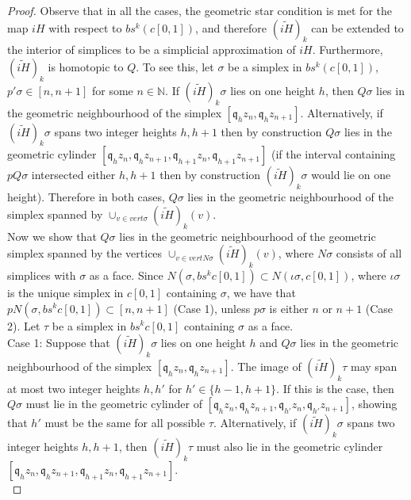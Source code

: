 \documentclass[a4paper,11pt]{article}
\theoremstyle{definition}
\theoremstyle{plain}
\theoremstyle{remark}
\begin{document}
{\begin{proof}
Observe that in all the cases, the geometric star condition is met for the map $iH$ with respect to $bs^{k}(c[0,1])$, and therefore $(\widetilde{iH})_{k}$ can be extended to the interior of simplices to be a simplicial approximation of $iH$. Furthermore, $(\widetilde{iH})_{k}$ is homotopic to $Q$. To see this, let $\sigma$ be a simplex in $bs^{k}(c[0,1])$, $p'\sigma \in [n,n+1]$ for some $n\in \mathbb{N}$. If $(\widetilde{iH})_{k}\sigma$ lies on one height $h$, then $Q\sigma$ lies in the geometric neighbourhood of the simplex $[\mathfrak{q}_{h}z_{n},\mathfrak{q}_{h}z_{n+1}]$. Alternatively, if $(\widetilde{iH})_{k}\sigma$ spans two integer heights $h,h+1$ then by construction $Q\sigma$ lies in the geometric cylinder $[\mathfrak{q}_{h}z_{n},\mathfrak{q}_{h}z_{n+1},\mathfrak{q}_{h+1}z_{n},\mathfrak{q}_{h+1}z_{n+1}]$ (if the interval containing $pQ\sigma$ intersected either $h,h+1$ then by construction $(\widetilde{iH})_{k}\sigma$ would lie on one height). Therefore in both cases, $Q\sigma$ lies in the geometric neighbourhood of the simplex spanned by $\cup_{v\in vert \sigma} (\widetilde{iH})_{k}(v)$.  \\


Now we show that $Q\sigma$ lies in the geometric neighbourhood of the geometric simplex spanned by the vertices $\cup_{v\in vert N\sigma} (\widetilde{iH})_{k}(v)$, where $N\sigma$ consists of all simplices with $\sigma$ as a face. Since $N(\sigma, bs^{k}{c[0,1]}) \subset N(\iota \sigma,c[0,1])$, where $\iota \sigma$ is the unique simplex in $c[0,1]$ containing $\sigma$, we have that $pN(\sigma, bs^{k}{c[0,1]})\subset [n,n+1]$ (Case 1), unless $p\sigma$ is either $n$ or $n+1$ (Case 2). Let $\tau$ be a simplex in $bs^{k}{c[0,1]}$ containing $\sigma$ as a face. \\

Case 1: Suppose that  $(\widetilde{iH})_{k}\sigma$ lies on one height $h$ and $Q\sigma$ lies in the geometric neighbourhood of the simplex $[\mathfrak{q}_{h}z_{n},\mathfrak{q}_{h}z_{n+1}]$. The image of $(\widetilde{iH})_{k}\tau$ may span at most two integer heights $h,h'$ for $h'\in \{h-1,h+1\}$. If this is the case, then $Q\sigma$ must lie in the geometric cylinder of $[\mathfrak{q}_{h}z_{n},\mathfrak{q}_{h} z_{n+1}, \mathfrak{q}_{h'}z_{n},\mathfrak{q}_{h'} z_{n+1}]$, showing that $h'$ must be the same for all possible $\tau$.  Alternatively, if $(\widetilde{iH})_{k}\sigma$ spans two integer heights $h,h+1$, then $(\widetilde{iH})_{k}\tau$ must also lie in the geometric cylinder $[\mathfrak{q}_{h}z_{n},\mathfrak{q}_{h}z_{n+1},\mathfrak{q}_{h+1}z_{n},\mathfrak{q}_{h+1}z_{n+1}]$.\\


\end{proof}}
\end{document}
